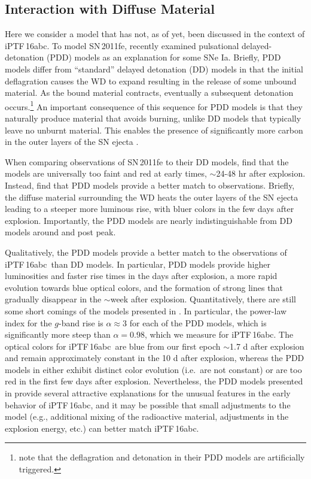 \documentclass[twocolumn]{aastex61}
\newcommand{\abc}{iPTF\,16abc}
\begin{document}
\subsection{Interaction with Diffuse Material}

Here we consider a model that has not, as of yet, been discussed in the context of \abc. To model SN\,2011fe, \citet{2014MNRAS.441..532D} recently examined pulsational delayed-detonation (PDD) models as an explanation for some SNe Ia. Briefly, PDD models differ from ``standard'' delayed detonation (DD) models in that the initial deflagration causes the WD to expand resulting in the release of some unbound material. As the bound material contracts, eventually a subsequent detonation occurs.\footnote{\citet{2014MNRAS.441..532D} note that the deflagration and detonation in their PDD models are artificially triggered.} An important consequence of this sequence for PDD models is that they naturally produce material that avoids burning, unlike DD models that typically leave no unburnt material. This enables the presence of significantly more carbon in the outer layers of the SN ejecta \citep{2014MNRAS.441..532D}.

When comparing observations of SN\,2011fe to their DD models, \citet{2014MNRAS.441..532D} find that the models are universally too faint and red at early times, $\sim$24-48 hr after explosion.  Instead, \citet{2014MNRAS.441..532D} find that PDD models provide a better match to observations. Briefly, the diffuse material surrounding the WD heats the outer layers of the SN ejecta leading to a steeper more luminous rise, with bluer colors in the few days after explosion. Importantly, the PDD models are nearly indistinguishable from DD models around and post peak. 

Qualitatively, the PDD models provide a better match to the observations of \abc\ than DD models. In particular, PDD models provide higher luminosities and faster rise times in the days after explosion, a more rapid evolution towards blue optical colors, and the formation of strong  lines that gradually disappear in the $\sim$week after explosion. Quantitatively, there are still some short comings of the models presented in \citet{2014MNRAS.441..532D}. In particular, the power-law index for the $g$-band rise is $\alpha \approx 3$ for each of the PDD models, which is significantly more steep than $\alpha = 0.98$, which we measure for \abc. The optical colors for \abc\ are blue from our first epoch $\sim$1.7 d after explosion and remain approximately constant in the 10 d after explosion, whereas the PDD models in \citet{2014MNRAS.441..532D} either exhibit distinct color evolution (i.e.\ are not constant) or are too red in the first few days after explosion. Nevertheless, the PDD models presented in \citet{2014MNRAS.441..532D} provide several attractive explanations for the unusual features in the early behavior of \abc, and it may be possible that small adjustments to the model (e.g., additional mixing of the radioactive material, adjustments in the explosion energy, etc.) can better match \abc.
\end{document}
